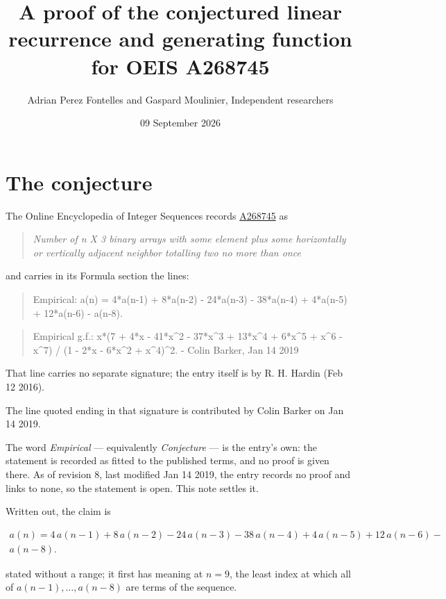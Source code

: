 \documentclass[11pt]{article}
\title{A proof of the conjectured linear recurrence and generating function for OEIS A268745}
\author{Adrian Perez Fontelles and Gaspard Moulinier, Independent researchers}
\date{09 September 2026}
\theoremstyle{definition}
\begin{document}
\maketitle
\section{The conjecture}

The Online Encyclopedia of Integer Sequences records \href{https://oeis.org/A268745}{A268745} as

\begin{quote}\itshape Number of n X 3 binary arrays with some element plus some horizontally or vertically adjacent neighbor totalling two no more than once\end{quote}

and carries in its Formula section the lines:

\begin{quote}\ttfamily Empirical: a(n) = 4*a(n-1) + 8*a(n-2) - 24*a(n-3) - 38*a(n-4) + 4*a(n-5) + 12*a(n-6) - a(n-8).\end{quote}

\begin{quote}\ttfamily Empirical g.f.: x*(7 + 4*x - 41*x\textasciicircum{}2 - 37*x\textasciicircum{}3 + 13*x\textasciicircum{}4 + 6*x\textasciicircum{}5 + x\textasciicircum{}6 - x\textasciicircum{}7) / (1 - 2*x - 6*x\textasciicircum{}2 + x\textasciicircum{}4)\textasciicircum{}2. - Colin Barker, Jan 14 2019\end{quote}

That line carries no separate signature; the entry itself is by R. H. Hardin (Feb 12 2016).

The line quoted ending in that signature is contributed by Colin Barker on Jan 14 2019.

The word {\itshape Empirical} --- equivalently {\itshape Conjecture} --- is the entry's own: the statement is recorded as fitted to the published terms, and no proof is given there. As of revision 8, last modified Jan 14 2019, the entry records no proof and links to none, so the statement is open. This note settles it.

Written out, the claim is

\begin{multline*} a(n) = 4\,a(n-1) + 8\,a(n-2) - 24\,a(n-3) - 38\,a(n-4) + 4\,a(n-5) + 12\,a(n-6) - \\ a(n-8). \end{multline*}

stated without a range; it first has meaning at $n = 9$, the least index at which all of $a(n-1),\dots,a(n-8)$ are terms of the sequence.
\end{document}
